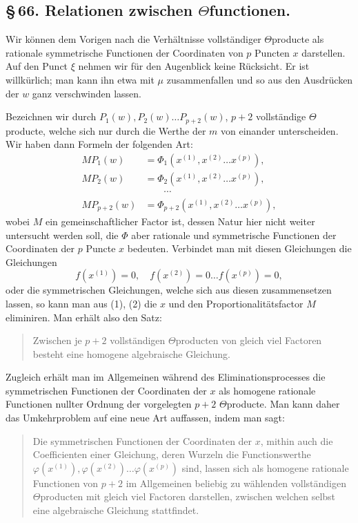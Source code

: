 \documentclass[10pt]{article}
\begin{document}
\subsection*{\S\,66. Relationen zwischen \(\Theta\)functionen.}

Wir können dem Vorigen nach die Verhältnisse vollständiger \(\Theta\)producte als rationale symmetrische Functionen der Coordinaten von \(p\) Puncten \(x\) darstellen. Auf den Punct \(\xi\) nehmen wir für den Augenblick keine Rücksicht. Er ist willkürlich; man kann ihn etwa mit \(\mu\) zusammenfallen und so aus den Ausdrücken der \(w\) ganz verschwinden lassen.

Bezeichnen wir durch \(P_1(w),P_2(w)\ldots P_{p+2}(w)\), \(p+2\) vollständige \(\Theta\)producte, welche sich nur durch die Werthe der \(m\) von einander unterscheiden. Wir haben dann Formeln der folgenden Art:
\[
\tag{1}
\begin{aligned}
M P_1(w)&=\Phi_1(x^{(1)},x^{(2)}\ldots x^{(p)}),\\
M P_2(w)&=\Phi_2(x^{(1)},x^{(2)}\ldots x^{(p)}),\\
&\hspace{2em}\cdots\\
M P_{p+2}(w)&=\Phi_{p+2}(x^{(1)},x^{(2)}\ldots x^{(p)}),
\end{aligned}
\]
wobei \(M\) ein gemeinschaftlicher Factor ist, dessen Natur hier nicht weiter untersucht werden soll, die \(\Phi\) aber rationale und symmetrische Functionen der Coordinaten der \(p\) Puncte \(x\) bedeuten. Verbindet man mit diesen Gleichungen die Gleichungen
\[
\tag{2}
f(x^{(1)})=0,\quad f(x^{(2)})=0\ldots f(x^{(p)})=0,
\]
oder die symmetrischen Gleichungen, welche sich aus diesen zusammensetzen lassen, so kann man aus (1), (2) die \(x\) und den Proportionalitätsfactor \(M\) eliminiren. Man erhält also den Satz:

\begin{quote}
Zwischen je \(p+2\) vollständigen \(\Theta\)producten von gleich viel Factoren besteht eine homogene algebraische Gleichung.
\end{quote}

Zugleich erhält man im Allgemeinen während des Eliminationsprocesses die symmetrischen Functionen der Coordinaten der \(x\) als homogene rationale Functionen nullter Ordnung der vorgelegten \(p+2\) \(\Theta\)producte. Man kann daher das Umkehrproblem auf eine neue Art auffassen, indem man sagt:

\begin{quote}
Die symmetrischen Functionen der Coordinaten der \(x\), mithin auch die Coefficienten einer Gleichung, deren Wurzeln die Functionswerthe \(\varphi(x^{(1)}),\varphi(x^{(2)})\ldots\varphi(x^{(p)})\) sind, lassen sich als homogene rationale Functionen von \(p+2\) im Allgemeinen beliebig zu wählenden vollständigen \(\Theta\)producten mit gleich viel Factoren darstellen, zwischen welchen selbst eine algebraische Gleichung stattfindet.
\end{quote}
\end{document}
